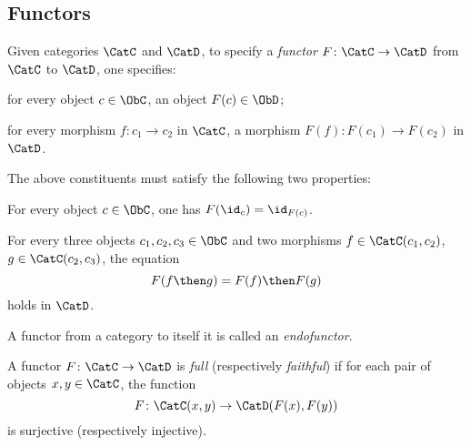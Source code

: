 \subsection{Functors}
\begin{shaded}
\begin{definition}[Functor]
\label{def:functor}
Given categories $\CatC$ and $\CatD$, to specify a \emph{functor} $F\colon \CatC\to \CatD$ from $\CatC$ to $\CatD$, one specifies:
\begin{compactenum}
    \item for every object $c\in \ObC$, an object $F(c)\in \ObD$;
    \item for every morphism $f\colon c_1\to c_2$ in $\CatC$, a morphism $F(f)\colon F(c_1)\to F(c_2)$ in $\CatD$.
\end{compactenum}
The above constituents must satisfy the following two properties:
\begin{compactenum}[(a)]
    \item For every object $c\in \ObC$, one has $F(\id_c)=\id_{F(c)}$.
    \item For every three objects $c_1,c_2,c_3 \in \ObC$ and two morphisms $f\in \CatC(c_1,c_2)$, $g\in \CatC(c_2,c_3)$, the equation 
    \begin{equation}
        F(f\then g)=F(f)\then F(g)
    \end{equation}
holds in $\CatD$.
\end{compactenum}
\end{definition}

\begin{remark}
A functor from a category to itself it is called an \emph{endofunctor}.
\end{remark}

\begin{definition}
\label{def:functorfullfaith}
A functor $F\colon \CatC \to \CatD$ is \emph{full} (respectively \emph{faithful}) if for each pair of objects $x,y\in \CatC$, the function
\begin{equation}
    F\colon \CatC(x,y)\to \CatD(F(x),F(y))
\end{equation}
is surjective (respectively injective).
\end{definition}
\end{shaded}

